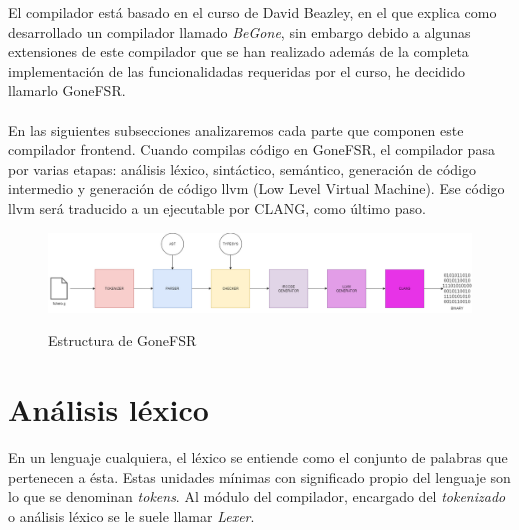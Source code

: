 El compilador está basado en el curso de David Beazley, en el que explica como desarrollado un compilador llamado \textit{BeGone}, sin embargo debido a algunas extensiones de este compilador que se han realizado además de la completa implementación de las funcionalidadas requeridas por el curso, he decidido llamarlo GoneFSR. \\\\
En las siguientes subsecciones analizaremos cada parte que componen este compilador frontend. Cuando compilas código en GoneFSR, el compilador pasa por varias etapas: análisis léxico, sintáctico, semántico, generación de código intermedio y generación de código llvm (Low Level Virtual Machine). Ese código llvm será traducido a un ejecutable por CLANG, como último paso.
\begin{figure}[h] 
    \centering
    \includegraphics[width=1\textwidth,keepaspectratio]{img/compiler-schema.png}
    \parbox{\linewidth}{\centering Estructura de GoneFSR}
    \label{fig:mi_imagen}
\end{figure}
\section{Análisis léxico}
En un lenguaje cualquiera,  el léxico se entiende como el conjunto de palabras  que pertenecen a ésta.
Estas unidades mínimas con significado propio del lenguaje son lo que se denominan \textit{tokens}.
Al módulo del compilador, encargado del  \textit{tokenizado} o análisis léxico se le suele llamar \textit{Lexer}.

